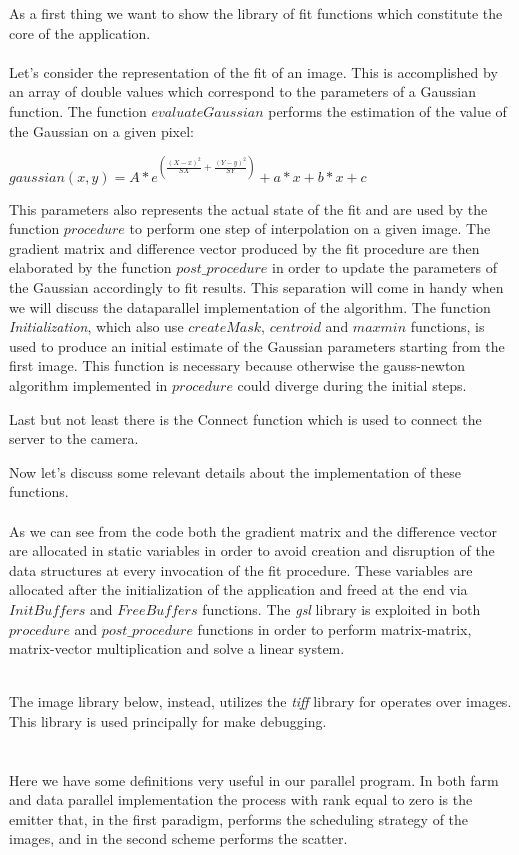 As a first thing we want to show the library of fit functions which constitute the core of the application.
\ \\


\ \\Let's consider the representation of the fit of an image.
This is accomplished by an array of double values which correspond to the parameters of a Gaussian function.
The function $evaluateGaussian$ performs the estimation of the value of the Gaussian on a given pixel:
\begin{center}
	$gaussian(x,y) = A * e^{( \frac{(X-x)^2}{SX} + \frac{(Y-y)^2}{SY} )} +a*x +b*x +c$
\end{center} 
This parameters also represents the actual state of the fit and are used by the function $procedure$ to perform one step of interpolation on a given image.
The gradient matrix and difference vector produced by the fit procedure are then elaborated by the function $post\_procedure$ in order to update the parameters of the Gaussian accordingly to fit results.
This separation will come in handy when we will discuss the dataparallel implementation of the algorithm.
The function \textit{Initialization}, which also use $createMask$, $centroid$ and $maxmin$ functions, is used to produce an initial estimate of the Gaussian parameters starting from the first image.
This function is necessary because otherwise the gauss-newton algorithm implemented in $procedure$ could diverge during the initial steps.

Last but not least there is the Connect function which is used to connect the server to the camera.

Now let's discuss some relevant details about the implementation of these functions.
\ \\


\ \\As we can see from the code both the gradient matrix and the difference vector are allocated in static variables in order to avoid creation and disruption of the data structures at every invocation of the fit procedure. 
These variables are allocated after the initialization of the application and freed at the end via $InitBuffers$ and $FreeBuffers$ functions.
The \textit{gsl} library is exploited in both $procedure$ and $post\_procedure$ functions in order to perform matrix-matrix, matrix-vector multiplication and solve a linear system.

\ \\The image library below, instead, utilizes the \textit{tiff} library for operates over images. This library is used principally for make debugging.
\ \\

\ \\

\ \\
Here we have some definitions very useful in our parallel program. In both farm and data parallel implementation the process with rank equal to zero is the emitter that, in the first paradigm, performs the scheduling strategy of the images, and in the second scheme performs the scatter.

